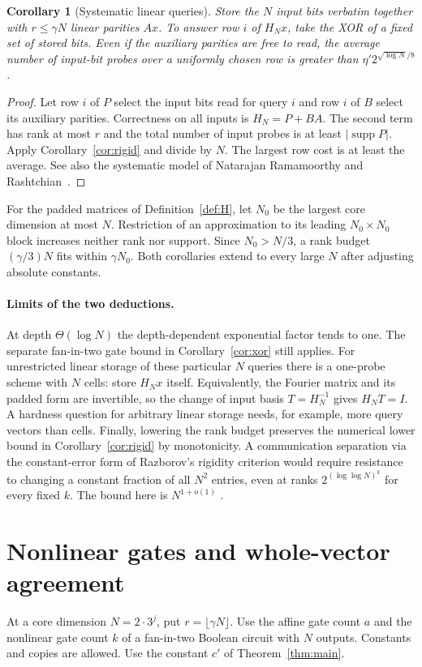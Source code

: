 \documentclass[11pt]{article}
\newtheorem{corollary}[theorem]{Corollary}
\theoremstyle{definition}
\theoremstyle{remark}
\newcommand{\supp}{\operatorname{supp}}
\begin{document}
\begin{corollary}[Systematic linear queries]\label{cor:probes}
Store the $N$ input bits verbatim together with $r\le\gamma N$ linear
parities $Ax$. To answer row $i$ of $H_Nx$, take the XOR of a fixed
set of stored bits. Even if the auxiliary parities are free to read,
the average number of input-bit probes over a uniformly chosen row is
greater than $\eta'2^{\sqrt{\log N}/8}$.
\end{corollary}
\begin{proof}
Let row $i$ of $P$ select the input bits read for query $i$ and row
$i$ of $B$ select its auxiliary parities. Correctness on all inputs
is $H_N=P+BA$. The second term has rank at most $r$ and the total
number of input probes is at least $|\supp P|$. Apply
Corollary~\ref{cor:rigid} and divide by $N$. The largest row cost
is at least the average. See also the systematic model of
Natarajan Ramamoorthy and Rashtchian~\cite{NRR}.
\end{proof}

For the padded matrices of Definition~\ref{def:H}, let $N_0$ be the
largest core dimension at most $N$. Restriction of an approximation
to its leading $N_0\times N_0$ block increases neither rank nor
support. Since $N_0>N/3$, a rank budget $(\gamma/3)N$ fits within
$\gamma N_0$. Both corollaries extend to every large $N$ after
adjusting absolute constants.

\paragraph{Limits of the two deductions.}
At depth $\Theta(\log N)$ the depth-dependent exponential factor
tends to one. The separate fan-in-two gate bound in
Corollary~\ref{cor:xor} still applies. For unrestricted linear
storage of these particular $N$ queries there is a one-probe
scheme with $N$ cells: store $H_Nx$ itself. Equivalently, the Fourier
matrix and its padded form are invertible, so the change of input
basis $T=H_N^{-1}$ gives $H_NT=I$. A hardness question for arbitrary
linear storage needs, for example, more query vectors than cells.
Finally, lowering the rank budget preserves the numerical lower bound
in Corollary~\ref{cor:rigid} by monotonicity. A communication
separation via the constant-error form of Razborov's rigidity
criterion would require resistance to changing a constant fraction of
all $N^2$ entries, even at ranks $2^{(\log\log N)^k}$ for every fixed
$k$. The bound here is $N^{1+o(1)}$ \cite{RazCC}.

\section{Nonlinear gates and whole-vector agreement}\label{sec:mixed}
At a core dimension $N=2\cdot3^j$, put $r=\lfloor\gamma N\rfloor$.
Use the affine gate count $a$ and the nonlinear gate count $k$ of a
fan-in-two Boolean circuit with $N$ outputs. Constants and copies are
allowed. Use the constant $c'$ of Theorem~\ref{thm:main}.
\end{document}
